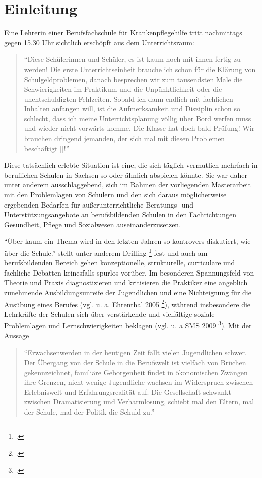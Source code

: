 \section{Einleitung}
\label{sec:Einleitung}

Eine Lehrerin einer Berufsfachschule für Krankenpflegehilfe tritt nachmittags gegen 15.30 Uhr sichtlich erschöpft aus dem Unterrichtsraum:
\begin{quotation}
\noindent
"`Diese Schülerinnen und Schüler, es ist kaum noch mit ihnen fertig zu werden! Die erste Unterrichtseinheit brauche ich schon für die Klärung von Schulgeldproblemen, danach besprechen wir zum tausendsten Male die Schwierigkeiten im Praktikum und die Unpünktlichkeit oder die unentschuldigten Fehlzeiten. Sobald ich dann endlich mit fachlichen Inhalten anfangen will, ist die Aufmerksamkeit und Disziplin schon so schlecht, dass ich meine Unterrichtsplanung völlig über Bord werfen muss und wieder nicht vorwärts komme. Die Klasse hat doch bald Prüfung! Wir brauchen dringend jemanden, der sich mal mit diesen Problemen beschäftigt [\punkte]!"'
\end{quotation}

\noindent
Diese tatsächlich erlebte Situation ist eine, die sich täglich vermutlich mehrfach in beruflichen Schulen in Sachsen so oder ähnlich abspielen könnte. Sie war daher unter anderem ausschlaggebend, sich im Rahmen der vorliegenden Masterarbeit mit den Problemlagen von Schülern und den sich daraus möglicherweise ergebenden Bedarfen für außerunterrichtliche Beratungs- und Unterstützungsangebote an berufsbildenden Schulen in den Fachrichtungen Gesundheit, Pflege und Sozialwesen auseinanderzusetzen. 

"`Über kaum ein Thema wird in den letzten Jahren so kontrovers diskutiert, wie über die Schule."' stellt unter anderem Drilling \footcite[9]{Drilling2004} fest und auch am berufsbildenden Bereich gehen konzeptionelle, strukturelle, curriculare und fachliche Debatten keinesfalls spurlos vorüber. Im besonderen Spannungsfeld von Theorie und Praxis diagnostizieren und kritisieren die Praktiker eine angeblich zunehmende Ausbildungsunreife der Jugendlichen und eine Nichteignung für die Ausübung eines Berufes (vgl. u. a. Ehrenthal 2005 \footcite[vgl.]{Ehrenthal2005}), während insbesondere die Lehrkräfte der Schulen sich über verstärkende und vielfältige soziale Problemlagen und Lernschwierigkeiten beklagen (vgl. u. a SMS 2009 \footcite[vgl.][13]{SMSSS2009}). Mit der Aussage [\punkte]

\begin{quotation}
\noindent
"`Erwachsenwerden in der heutigen Zeit fällt vielen Jugendlichen schwer. Der Übergang von der Schule in die Berufswelt ist vielfach von Brüchen gekennzeichnet, familiäre Geborgenheit findet in ökonomischen Zwängen ihre Grenzen, nicht wenige Jugendliche wachsen im Widerspruch zwischen Erlebniswelt und Erfahrungsrealität auf. Die Gesellschaft schwankt zwischen Dramatisierung und Verharmlosung, schiebt mal den Eltern, mal der Schule, mal der Politik die Schuld zu."' 
\end{quotation}

